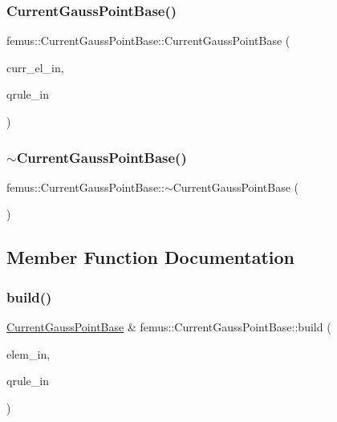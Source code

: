 \subsubsection{\texorpdfstring{Current\+Gauss\+Point\+Base()}{CurrentGaussPointBase()}}
{\footnotesize\ttfamily femus\+::\+Current\+Gauss\+Point\+Base\+::\+Current\+Gauss\+Point\+Base (\begin{DoxyParamCaption}\item[{const \mbox{\hyperlink{classfemus_1_1_current_elem}{Current\+Elem}} \&}]{curr\+\_\+el\+\_\+in,  }\item[{const \mbox{\hyperlink{classfemus_1_1_gauss}{Gauss}} \&}]{qrule\+\_\+in }\end{DoxyParamCaption})}

\mbox{\label{classfemus_1_1_current_gauss_point_base_a8e1ed382c638f02ac176557e4b741a8e}} 
\subsubsection{\texorpdfstring{$\sim$\+Current\+Gauss\+Point\+Base()}{~CurrentGaussPointBase()}}
{\footnotesize\ttfamily femus\+::\+Current\+Gauss\+Point\+Base\+::$\sim$\+Current\+Gauss\+Point\+Base (\begin{DoxyParamCaption}{ }\end{DoxyParamCaption})}



\subsection{Member Function Documentation}
\mbox{\label{classfemus_1_1_current_gauss_point_base_acc707006f412446178805a78247867bc}} 
\subsubsection{\texorpdfstring{build()}{build()}}
{\footnotesize\ttfamily \mbox{\hyperlink{classfemus_1_1_current_gauss_point_base}{Current\+Gauss\+Point\+Base}} \& femus\+::\+Current\+Gauss\+Point\+Base\+::build (\begin{DoxyParamCaption}\item[{const \mbox{\hyperlink{classfemus_1_1_current_elem}{Current\+Elem}} \&}]{elem\+\_\+in,  }\item[{const \mbox{\hyperlink{classfemus_1_1_gauss}{Gauss}} \&}]{qrule\+\_\+in }\end{DoxyParamCaption})\hspace{0.3cm}{\ttfamily [static]}}


